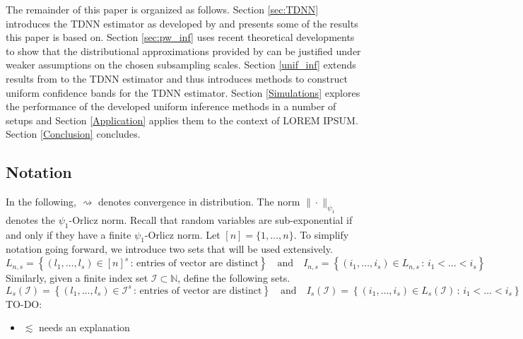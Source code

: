 \documentclass[letterpaper,10pt]{article}
\numberwithin{equation}{section}
\numberwithin{thm}{section}
\numberwithin{lem}{section}
\numberwithin{cor}{section}
\newcommand{\1}{\mathbbm{1}}
\begin{document}
The remainder of this paper is organized as follows.
Section \ref{sec:TDNN} introduces the TDNN estimator as developed by \citet{demirkaya_optimal_2024} and presents some of the results this paper is based on.
Section \ref{sec:pw_inf} uses recent theoretical developments to show that the distributional approximations provided by \citet{demirkaya_optimal_2024} can be justified under weaker assumptions on the chosen subsampling scales.
Section \ref{unif_inf} extends results from \citet{ritzwoller_uniform_2024} to the TDNN estimator and thus introduces methods to construct uniform confidence bands for the TDNN estimator.
Section \ref{Simulations} explores the performance of the developed uniform inference methods in a number of setups and Section \ref{Application} applies them to the context of {\color{red} LOREM IPSUM}.
Section \ref{Conclusion} concludes.

\subsection{Notation}
In the following, $\rightsquigarrow$ denotes convergence in distribution.
The norm $\| \cdot \|_{\psi_1}$ denotes the $\psi_1$-Orlicz norm.
Recall that random variables are sub-exponential if and only if they have a finite $\psi_1$-Orlicz norm.
Let $[n] = \{1, \dotsc, n\}$.
To simplify notation going forward, we introduce two sets that will be used extensively.
\begin{equation}
	L_{n,s} = \left\{\left(l_1, \dotsc, l_s\right) \in [n]^{s} \, : \, \text{entries of vector are distinct} \right\}
	\quad \text{and} \quad
	I_{n,s} = \left\{\left(i_1, \dotsc, i_s\right) \in L_{n,s} \, : \, i_1 < \dotsc < i_s \right\}
\end{equation}
Similarly, given a finite index set $\mathcal{I} \subset \mathbb{N}$, define the following sets.
\begin{equation}
	L_{s}(\mathcal{I}) = \left\{\left(l_1, \dotsc, l_s\right) \in \mathcal{I}^{s} \, : \, \text{entries of vector are distinct} \right\}
	\quad \text{and} \quad
	I_{s}(\mathcal{I}) = \left\{\left(i_1, \dotsc, i_s\right) \in L_{s}(\mathcal{I}) \, : \, i_1 < \dotsc < i_s \right\}
\end{equation}
{\color{red} TO-DO:}
\begin{itemize}
	\item $\lesssim$ needs an explanation
\end{itemize}


\newpage
\end{document}
